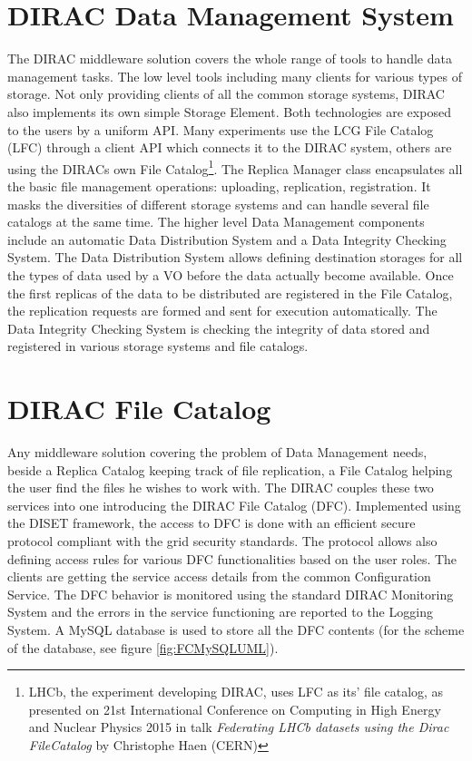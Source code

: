 \section{DIRAC Data Management System}

The DIRAC middleware solution covers the whole range of tools to handle data management tasks. The low level 
tools including many clients for various types of storage. Not only providing clients of all 
the common storage systems, DIRAC also implements its own simple Storage Element. Both technologies are 
exposed to the users by a uniform API. Many experiments use the LCG
File Catalog (LFC) through a client API which connects it to the DIRAC system, others are using 
the DIRACs own File Catalog\footnote{LHCb, the experiment developing DIRAC, uses LFC as its' file catalog, as 
presented on 21st International Conference on Computing in High Energy and Nuclear
Physics 2015 in talk \textit{Federating LHCb datasets using the Dirac FileCatalog} by Christophe Haen (CERN)}. 
The Replica Manager class encapsulates all the basic file 
management operations: uploading, replication, registration. It masks the diversities 
of different storage systems and can handle several file catalogs at the same time. 
The higher level Data Management components include an automatic Data Distribution System and
a Data Integrity Checking System. The Data Distribution System allows defining destination storages
for all the types of data used by a VO before the data actually become available. Once the first replicas
of the data to be distributed are registered in the File Catalog, the replication requests are formed and
sent for execution automatically. The Data Integrity Checking System is checking the integrity of data stored and
registered in various storage systems and file catalogs. 

\section{DIRAC File Catalog}

Any middleware solution covering the problem of Data Management needs, beside a Replica Catalog keeping track of 
file replication, a File Catalog helping the user find the files he wishes to work with. The DIRAC 
couples these two services into one introducing the DIRAC File Catalog (DFC)\cite{DFC}. 
Implemented using the DISET framework, the access to DFC is done with an efficient secure 
protocol compliant with the grid security standards.
The protocol allows also defining access rules for various DFC functionalities based on the user roles. The
clients are getting the service access details from the common Configuration Service. The DFC behavior
is monitored using the standard DIRAC Monitoring System and the errors in the service functioning are
reported to the Logging System. A MySQL database is used to store all the DFC contents (for the scheme of the 
database, see figure \ref{fig:FCMySQLUML}). 

